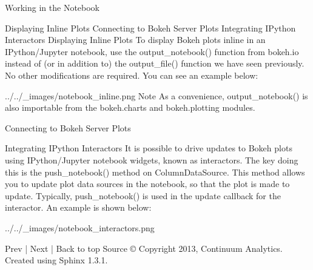 Working in the Notebook

Displaying Inline Plots
Connecting to Bokeh Server Plots
Integrating IPython Interactors
Displaying Inline Plots
To display Bokeh plots inline in an IPython/Jupyter notebook, use the output_notebook() function from bokeh.io instead of (or in addition to) the output_file() function we have seen previously. No other modifications are required. You can see an example below:

../../_images/notebook_inline.png
Note
As a convenience, output_notebook() is also importable from the bokeh.charts and bokeh.plotting modules.

Connecting to Bokeh Server Plots

Integrating IPython Interactors
It is possible to drive updates to Bokeh plots using IPython/Jupyter notebook widgets, known as interactors. The key doing this is the push_notebook() method on ColumnDataSource. This method allows you to update plot data sources in the notebook, so that the plot is made to update. Typically, push_notebook() is used in the update callback for the interactor. An example is shown below:

../../_images/notebook_interactors.png

Prev | Next | Back to top 
Source
© Copyright 2013, Continuum Analytics.
Created using Sphinx 1.3.1.